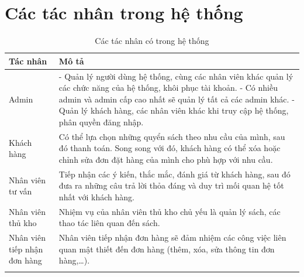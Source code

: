 \documentclass{report}
\begin{document}
\section{Các tác nhân trong hệ thống}
\fontsize{13}{15}\selectfont
	\centering
	\begin{longtable}{|m{5cm}|m{10.5cm}|} 
		\hline
			\centering\textbf{Tác nhân} & \centerline{\textbf{Mô tả}}\\
		\hline
			\centering Admin & - Quản lý người dùng hệ thống, cùng các nhân viên khác quản lý các chức năng của hệ thống, khôi phục tài khoản.
			\newline - Có nhiều admin và admin cấp cao nhất sẽ quản lý tất cả các admin khác.
			\newline - Quản lý khách hàng, các nhân viên khác khi truy cập hệ thống, phân quyền đăng nhập.\\
		\hline
			\centering Khách hàng  & Có thể lựa chọn những quyển sách theo nhu cầu của mình, sau đó thanh toán. Song song với đó, khách hàng có thể xóa hoặc chỉnh sửa đơn đặt hàng của mình cho phù hợp với nhu cầu. \\ 
		\hline
			\centering Nhân viên tư vấn  & Tiếp nhận các ý kiến, thắc mắc, đánh giá từ khách hàng, sau đó đưa ra những câu trả lời thỏa đáng và duy trì mối quan hệ tốt nhất với khách hàng.\\ 
		\hline
			\centering Nhân viên thủ kho  & Nhiệm vụ của nhân viên thủ kho chủ yếu là quản lý sách, các thao tác liên quan đến sách.\\
		\hline
			\centering Nhân viên tiếp nhận đơn hàng  & Nhân viên tiếp nhận đơn hàng sẽ đảm nhiệm các công việc liên quan mật thiết đến đơn hàng (thêm, xóa, sửa thông tin đơn hàng,…). \\
		\hline
		\caption{Các tác nhân có trong hệ thống}
	\end{longtable}
\raggedright

\pagebreak
\end{document}
